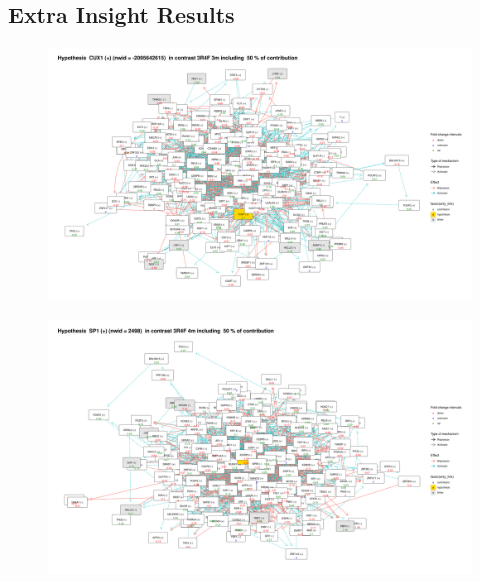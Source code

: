\subsection{Extra Insight Results}
\label{section:suppl:results}

\begin{figure}[!h]
    \centering
    \includegraphics[width=\textwidth, height=\textheight, keepaspectratio]{Major Thesis/figures/iut/graph/3R4F3m50-CUX1.png}
    \caption{}
\end{figure}

\begin{figure}[!h]
    \centering
    \includegraphics[width=\textwidth, height=\textheight, keepaspectratio]{Major Thesis/figures/iut/graph/3R4F4m50-SP1.png}
    \caption{}
\end{figure}

